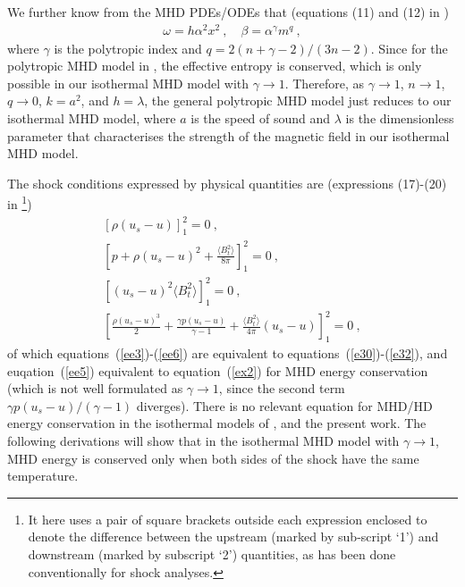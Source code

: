 \documentclass[fleqn,usenatbib]{mnras}
\begin{document}
We further know from the MHD PDEs/ODEs that (equations (11) and (12) in \citet{wang2008dynamic}) 
\begin{gather}
\omega=h\alpha^{2}x^{2}\ ,\quad \beta=\alpha^{\gamma}m^{q}\ ,\label{ee2}
\end{gather}
where $\gamma$ is the polytropic index and $q=2(n+\gamma-2)/(3n-2)$. Since for the polytropic MHD model in \citet{wang2008dynamic}, the effective entropy is conserved, which is only possible in our isothermal MHD model with $\gamma\rightarrow 1$. Therefore, as $\gamma\rightarrow 1$, $n\rightarrow 1$, $q\rightarrow 0$, $k=a^{2}$, and $h=\lambda$, the general polytropic MHD model just reduces to our isothermal MHD model, where $a$ is the speed of sound and $\lambda$ is the dimensionless parameter that characterises the strength of the magnetic field in our isothermal MHD model.

The shock conditions expressed by physical quantities are (expressions (17)-(20) in \citet{wang2008dynamic}\footnote{It here uses a pair of square brackets outside each expression enclosed to denote the difference between the upstream (marked by sub-script `1') and downstream (marked by subscript `2') quantities, as has been done conventionally for shock analyses.})
\begin{gather}
\left[\rho\left(u_{s}-u\right)\right]_{1}^{2}=0\ ,\label{ee3}\\
\left[p+\rho\left(u_{s}-u\right)^{2}+\frac{\langle B_{t}^{2}\rangle}{8\pi}\right]_{1}^{2}=0\ ,\label{ee4}\\
\left[\left(u_{s}-u\right)^{2}\langle B_{t}^{2}\rangle\right]_{1}^{2}=0\ ,\label{ee6}\\
\left[\frac{\rho\left(u_{s}-u\right)^{3}}{2}+\frac{\gamma p\left(u_{s}-u\right)}{\gamma-1}+\frac{\langle B_{t}^{2}\rangle}{4\pi}\left(u_{s}-u\right)\right]_{1}^{2}=0\ ,\label{ee5}
\end{gather}
of which equations~(\ref{ee3})-(\ref{ee6}) are equivalent to equations~(\ref{e30})-(\ref{e32}), and euqation~(\ref{ee5}) equivalent to equation~(\ref{ex2}) for MHD energy conservation (which is not well formulated as $\gamma\rightarrow 1$, since the second term $\gamma p\left(u_{s}-u\right)/(\gamma-1)$ diverges). There is no relevant equation for MHD/HD energy conservation in the isothermal models of \citet{lou2014self}, \citet{yuLou2006} and the present work. The following derivations will show that in the isothermal MHD model with $\gamma\rightarrow 1$, MHD energy is conserved only when both sides of the shock have the same temperature.
\end{document}
